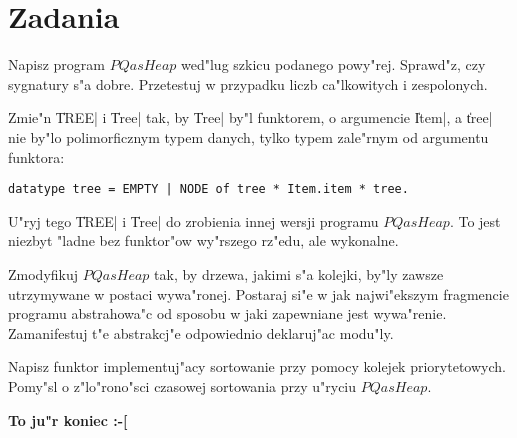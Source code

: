 \section*{Zadania}
\begin{zadania} 

\item
Napisz program $PQasHeap$ wed"lug szkicu podanego powy"rej. 
Sprawd"z, czy sygnatury s"a dobre.
Przetestuj w przypadku liczb ca"l\-ko\-wi\-tych i zespolonych.

\item
Zmie"n \|TREE| i \|Tree| tak, by \|Tree| by"l funktorem, o argumencie \|Item|,
a \|tree| nie by"lo polimorficznym typem danych, tylko typem zale"rnym od argumentu funktora:
\begin{verbatim}
datatype tree = EMPTY | NODE of tree * Item.item * tree.  
\end{verbatim}

U"ryj tego \|TREE| i \|Tree| do zrobienia innej wersji programu $PQasHeap$.
To jest niezbyt "ladne bez funktor"ow wy"rszego rz"edu, ale wykonalne.

\item
Zmodyfikuj $PQasHeap$ tak, by drzewa, jakimi s"a kolejki, 
by"ly zawsze utrzymywane w postaci wywa"ronej.
Postaraj si"e w jak najwi"ekszym fragmencie programu
abstrahowa"c od sposobu w jaki zapewniane jest wywa"renie.
Zamanifestuj t"e abstrakcj"e odpowiednio deklaruj"ac modu"ly.

\item
Napisz funktor implementuj"acy sortowanie przy pomocy kolejek priorytetowych.
Pomy"sl o z"lo"rono"sci czasowej sortowania przy u"ryciu $PQasHeap$.

\end{zadania}

\bigskip

{\bf To ju"r koniec :-[}


